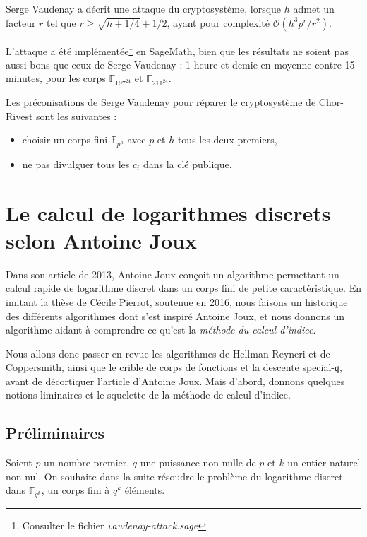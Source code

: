 \documentclass[a4paper, titlepage, 11pt]{article}
\theoremstyle{definition}
\theoremstyle{remark}
\def\O{\mathcal O}
\def\gf #1{\mathbb{F}_{#1}}
\begin{document}
Serge Vaudenay a décrit une attaque du cryptosystème, lorsque $h$ admet un facteur $r$ tel que $r \geqslant \sqrt{h + 1/4} + 1/2$, ayant pour complexité $\O(h^3p^r/r^2)$.

L'attaque a été implémentée\footnote{Consulter le fichier \textit{vaudenay-attack.sage}} en SageMath, bien que les résultats ne soient pas aussi bons que ceux de Serge Vaudenay : 1 heure et demie en moyenne contre 15 minutes, pour les corps $\gf{197^{24}}$ et $\gf{211^{24}}$.

Les préconisations de Serge Vaudenay pour réparer le cryptosystème de Chor-Rivest sont les suivantes : \begin{itemize}
\item choisir un corps fini $\gf{p^h}$ avec $p$ et $h$ tous les deux premiers,
\item ne pas divulguer tous les $c_i$ dans la clé publique.
\end{itemize}

\section{Le calcul de logarithmes discrets selon Antoine Joux}\label{sec:DLPJoux}


Dans son article \cite{joux2013} de 2013, Antoine Joux conçoit un algorithme permettant un calcul rapide de logarithme discret dans un corps fini de petite caractéristique. En imitant la thèse \cite{pierrot2016} de Cécile Pierrot, soutenue en 2016, nous faisons un historique des différents algorithmes dont s'est inspiré Antoine Joux, et nous donnons un algorithme aidant à comprendre ce qu'est la \textit{méthode du calcul d'indice}.

Nous allons donc passer en revue les algorithmes de Hellman-Reyneri et de Coppersmith, ainsi que le crible de corps de fonctions et la descente special-$\mathfrak{q}$, avant de décortiquer l'article \cite{joux2013} d'Antoine Joux. Mais d’abord, donnons quelques notions liminaires et le squelette de la méthode de calcul d’indice.

\subsection{Préliminaires}

Soient $p$ un nombre premier, $q$ une puissance non-nulle de $p$ et $k$ un entier naturel non-nul. On souhaite dans la suite résoudre le problème du logarithme discret dans $\gf{q^k}$, un corps fini à $q^k$ éléments.
\end{document}
